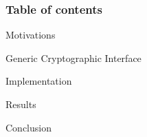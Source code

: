 \begin{frame}
	\frametitle{Table of contents}
	
	\begin{enumerate}
  		\Large{
  		\item Motivations  	
  		\vspace{0.25cm}
  		\item Generic Cryptographic Interface
  		\vspace{0.25cm}
  		\item Implementation
  		\vspace{0.25cm}
  		\item Results
  		\vspace{0.25cm}
  		\item Conclusion
  		}
	\end{enumerate}

\end{frame}
